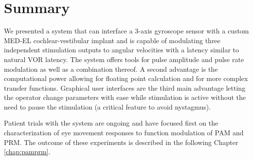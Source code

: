\section{Summary}
We presented a system that can interface a 3-axis gyroscope sensor with a custom MED-EL cochlear-vestibular implant and is capable of modulating three independent stimulation outputs to angular velocities with a latency similar to natural VOR latency. The system offers tools for pulse amplitude and pulse rate modulation as well as a combination thereof. A second advantage is the computational power allowing for floating point calculation and for more complex transfer functions. Graphical user interfaces are the third main advantage letting the operator change parameters with ease while stimulation is active without the need to pause the stimulation (a critical feature to avoid nystagmus). 

	Patient trials with the system are ongoing and have focused first on the characterization of eye movement responses to function modulation of PAM and PRM. The outcome of these experiments is described in the following Chapter\,\ref{chap:pamprm}.
